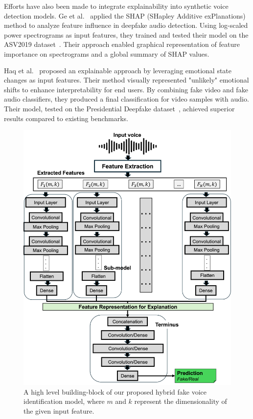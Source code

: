 \documentclass{article}
\begin{document}
Efforts have also been made to integrate explainability into synthetic voice detection models. Ge et al.~\cite{ge_explaining_2024} applied the SHAP (SHapley Additive exPlanations) method to analyze feature influence in deepfake audio detection. Using log-scaled power spectrograms as input features, they trained and tested their model on the ASV2019 dataset~\cite{wang_asvspoof_2020}. Their approach enabled graphical representation of feature importance on spectrograms and a global summary of SHAP values.

Haq et al.~\cite{haq_multimodal_2023} proposed an explainable approach by leveraging emotional state changes as input features. Their method visually represented "unlikely" emotional shifts to enhance interpretability for end users. By combining fake video and fake audio classifiers, they produced a final classification for video samples with audio. Their model, tested on the Presidential Deepfake dataset~\cite{sankaranarayanan_presidential_nodate}, achieved superior results compared to existing benchmarks.
    
 \begin{figure}[t]
    \centering
    \includegraphics[width=0.75\linewidth]{images/Picture1.png}
    \caption{A high level building-block of our proposed hybrid fake voice identification model, where \(m\) and \(k\) represent the dimensionality of the given input feature.}
    \label{fig:overview}
\end{figure}
\end{document}
